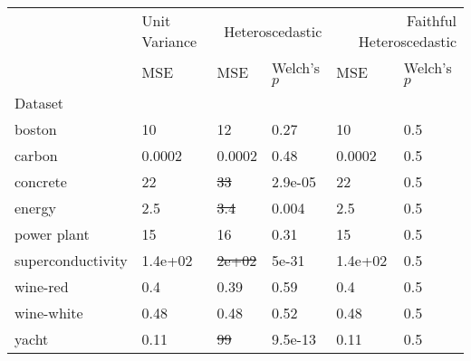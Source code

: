 \begin{tabular}{l|l|ll|ll}
\toprule
 & Unit Variance & \multicolumn{2}{r}{Heteroscedastic} & \multicolumn{2}{r}{Faithful Heteroscedastic} \\
 & MSE & MSE & Welch's $p$ & MSE & Welch's $p$ \\
Dataset &  &  &  &  &  \\
\midrule
boston & 10 & 12 & 0.27 & 10 & 0.5 \\
carbon & 0.0002 & 0.0002 & 0.48 & 0.0002 & 0.5 \\
concrete & 22 & \sout{33} & 2.9e-05 & 22 & 0.5 \\
energy & 2.5 & \sout{3.4} & 0.004 & 2.5 & 0.5 \\
power plant & 15 & 16 & 0.31 & 15 & 0.5 \\
superconductivity & 1.4e+02 & \sout{2e+02} & 5e-31 & 1.4e+02 & 0.5 \\
wine-red & 0.4 & 0.39 & 0.59 & 0.4 & 0.5 \\
wine-white & 0.48 & 0.48 & 0.52 & 0.48 & 0.5 \\
yacht & 0.11 & \sout{99} & 9.5e-13 & 0.11 & 0.5 \\
\bottomrule
\end{tabular}
